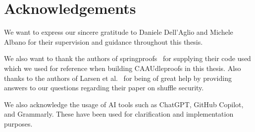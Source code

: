 

\section{Acknowledgements}\label{sec:acknowledgements}
We want to express our sincere gratitude to Daniele Dell'Aglio and Michele Albano for their supervision and guidance throughout this thesis.

We also want to thank the authors of springproofs~\cite{zhang2024springproofs} for supplying their code used which we used for reference when building CAAUdleproofs in this thesis.
Also thanks to the authors of Larsen et al.~\cite{cryptoeprint:2022/560} for being of great help by providing answers to our questions regarding their paper on shuffle security.

We also acknowledge the usage of AI tools such as ChatGPT, GitHub Copilot, and Grammarly.
These have been used for clarification and implementation purposes.